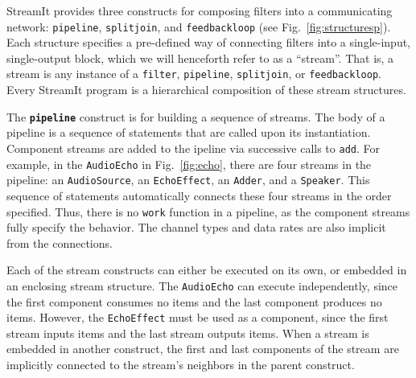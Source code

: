 StreamIt provides three constructs for composing filters into a
communicating network: \texttt{pipeline}, \texttt{splitjoin}, and
\texttt{feedbackloop} (see Fig.~\ref{fig:structuresp}).  Each
structure specifies a pre-defined way of connecting filters into a
single-input, single-output block, which we will henceforth refer to
as a ``stream''.  That is, a stream is any instance of a \texttt{filter},
\texttt{pipeline}, \texttt{splitjoin}, or \texttt{feedbackloop}.
Every StreamIt program is a hierarchical composition of these stream
structures.

The \textbf{\texttt{pipeline}} construct is for building a sequence of
streams.  The body of a pipeline is a sequence of statements that are
called upon its instantiation.  Component streams are added to the
ipeline via successive calls to \texttt{add}.  For example, in the
\texttt{AudioEcho} in Fig.~\ref{fig:echo}, there are four streams in
the pipeline: an \texttt{AudioSource}, an \texttt{EchoEffect}, an
\texttt{Adder}, and a \texttt{Speaker}.  This sequence of statements
automatically connects these four streams in the order specified.
Thus, there is no \texttt{work} function in a pipeline, as the
component streams fully specify the behavior.  The channel types and
data rates are also implicit from the connections.

Each of the stream constructs can either be executed on its own, or
embedded in an enclosing stream structure.  The \texttt{AudioEcho} can
execute independently, since the first component consumes no items and
the last component produces no items.  However, the
\texttt{EchoEffect} must be used as a component, since the first
stream inputs items and the last stream outputs items.  When a stream
is embedded in another construct, the first and last components of the
stream are implicitly connected to the stream's neighbors in the
parent construct.


